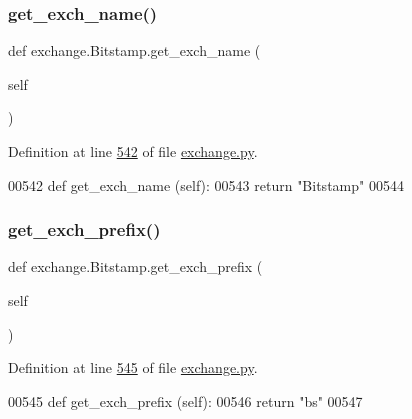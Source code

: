 \subsubsection{\texorpdfstring{get\+\_\+exch\+\_\+name()}{get\_exch\_name()}}
{\footnotesize\ttfamily def exchange.\+Bitstamp.\+get\+\_\+exch\+\_\+name (\begin{DoxyParamCaption}\item[{}]{self }\end{DoxyParamCaption})}



Definition at line \hyperlink{exchange_8py_source_l00542}{542} of file \hyperlink{exchange_8py_source}{exchange.\+py}.


\begin{DoxyCode}
00542     \textcolor{keyword}{def }get\_exch\_name (self):
00543         \textcolor{keywordflow}{return} \textcolor{stringliteral}{"Bitstamp"}
00544     
\end{DoxyCode}
\mbox{\label{classexchange_1_1_bitstamp_ace1b45bfd14260bbed7888cc9f21ca78}} 
\subsubsection{\texorpdfstring{get\+\_\+exch\+\_\+prefix()}{get\_exch\_prefix()}}
{\footnotesize\ttfamily def exchange.\+Bitstamp.\+get\+\_\+exch\+\_\+prefix (\begin{DoxyParamCaption}\item[{}]{self }\end{DoxyParamCaption})}



Definition at line \hyperlink{exchange_8py_source_l00545}{545} of file \hyperlink{exchange_8py_source}{exchange.\+py}.


\begin{DoxyCode}
00545     \textcolor{keyword}{def }get\_exch\_prefix (self):
00546         \textcolor{keywordflow}{return} \textcolor{stringliteral}{"bs"}
00547         
\end{DoxyCode}
\mbox{\label{classexchange_1_1_bitstamp_aa065ba9bff0d002816abd6caae2cfb99}} 
